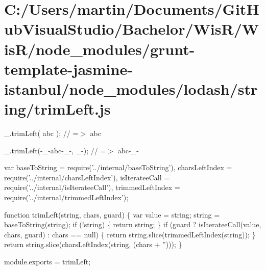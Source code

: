 \hypertarget{_c_1_2_users_2martin_2_documents_2_git_hub_visual_studio_2_bachelor_2_wis_r_2_wis_r_2node_moduleb90a6851e6eb0646cfd6ee318d679b9f}{}\section{C\+:/\+Users/martin/\+Documents/\+Git\+Hub\+Visual\+Studio/\+Bachelor/\+Wis\+R/\+Wis\+R/node\+\_\+modules/grunt-\/template-\/jasmine-\/istanbul/node\+\_\+modules/lodash/string/trim\+Left.\+js}
\+\_\+.\+trim\+Left(\textquotesingle{} abc \textquotesingle{}); // =$>$ \textquotesingle{}abc \textquotesingle{}

\+\_\+.\+trim\+Left(\textquotesingle{}-\/\+\_\+-\/abc-\/\+\_\+-\/\textquotesingle{}, \textquotesingle{}\+\_\+-\/\textquotesingle{}); // =$>$ \textquotesingle{}abc-\/\+\_\+-\/\textquotesingle{}


\begin{DoxyCodeInclude}
var baseToString = require(\textcolor{stringliteral}{'../internal/baseToString'}),
    charsLeftIndex = require(\textcolor{stringliteral}{'../internal/charsLeftIndex'}),
    isIterateeCall = require(\textcolor{stringliteral}{'../internal/isIterateeCall'}),
    trimmedLeftIndex = require(\textcolor{stringliteral}{'../internal/trimmedLeftIndex'});

\textcolor{keyword}{function} trimLeft(\textcolor{keywordtype}{string}, chars, guard) \{
  var value = string;
  \textcolor{keywordtype}{string} = baseToString(\textcolor{keywordtype}{string});
  \textcolor{keywordflow}{if} (!\textcolor{keywordtype}{string}) \{
    \textcolor{keywordflow}{return} string;
  \}
  \textcolor{keywordflow}{if} (guard ? isIterateeCall(value, chars, guard) : chars == null) \{
    \textcolor{keywordflow}{return} \textcolor{keywordtype}{string}.slice(trimmedLeftIndex(\textcolor{keywordtype}{string}));
  \}
  \textcolor{keywordflow}{return} \textcolor{keywordtype}{string}.slice(charsLeftIndex(\textcolor{keywordtype}{string}, (chars + \textcolor{stringliteral}{''})));
\}

module.exports = trimLeft;
\end{DoxyCodeInclude}
 